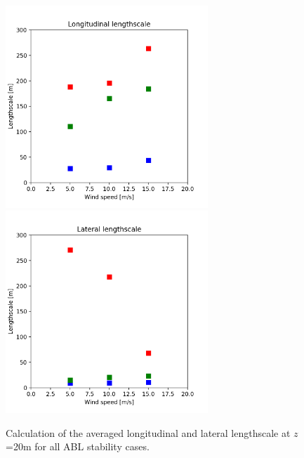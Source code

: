 \begin{figure}[hbt!]
  \centering
   \\
  \includegraphics[width=3in]{figures/AllStability_Rij_LongitudinalLengthscale.png}
  \includegraphics[width=3in]{figures/AllStability_Rij_LateralLengthscale.png}
  \caption{ \label{fig:AllStabilityLengthscale} Calculation of the
    averaged longitudinal and lateral lengthscale at $z$=20m for all
    ABL stability cases.}
\end{figure}

